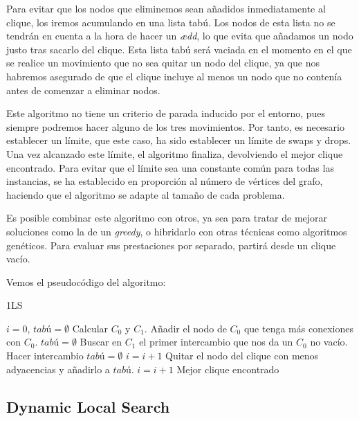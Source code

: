 Para evitar que los nodos que eliminemos sean añadidos inmediatamente al clique, los iremos
acumulando en una lista tabú. Los nodos de esta lista no se tendrán en cuenta a la hora de
hacer un \textit{ædd}, lo que evita que añadamos un nodo justo tras sacarlo del clique.
Esta lista tabú será vaciada en el momento en el que se realice un movimiento que no sea
quitar un nodo del clique, ya que nos habremos asegurado de que el clique incluye al menos
un nodo que no contenía antes de comenzar a eliminar nodos.

Este algoritmo no tiene un criterio de parada inducido por el entorno, pues siempre podremos
hacer alguno de los tres movimientos. Por tanto, es necesario establecer un límite, que este
caso, ha sido establecer un límite de swaps y drops. Una vez alcanzado este límite, el algoritmo
finaliza, devolviendo el mejor clique encontrado. Para evitar que el límite sea una constante
común para todas las instancias, se ha establecido en proporción al número de vértices del grafo,
haciendo que el algoritmo se adapte al tamaño de cada problema.

Es posible combinar este algoritmo con otros, ya sea para tratar de mejorar soluciones
como la de un \textit{greedy}, o hibridarlo con otras técnicas como algoritmos
genéticos. Para evaluar sus prestaciones por separado, partirá desde un clique vacío.

Vemos el pseudocódigo del algoritmo:

\begin{algorithm}[H]
\caption{1LS}
  \begin{algorithmic}
    \State $i = 0$, $tabú = \emptyset$
    \State Calcular $C_0$ y $C_1$.
    \Repeat
        \State Añadir el nodo de $C_0$ que tenga más conexiones con $C_0$.
        \State $tabú = \emptyset$
      \Else
        \State Buscar en $C_1$ el primer intercambio que nos da un $C_0$ no vacío.
          \State Hacer intercambio
          \State $tabú = \emptyset$
          \State $i = i + 1$
        \Else
          \State Quitar el nodo del clique con menos adyacencias y añadirlo a $tabú$.
          \State $i = i + 1$
        \EndIf
      \EndIf
    \Return Mejor clique encontrado
    \EndFunction
  \end{algorithmic}
\end{algorithm}

\subsection{Dynamic Local Search}\label{dls}

